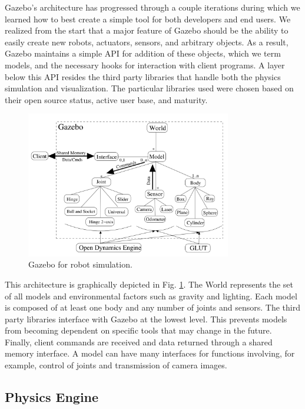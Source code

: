 Gazebo's architecture has progressed through a couple iterations during which we learned how to best create a simple tool for both developers and end users. We realized from the start that a major feature of Gazebo should be the ability to easily create new robots, actuators, sensors, and arbitrary objects. As a result, Gazebo maintains a simple API for addition of these objects, which we term models, and the necessary hooks for interaction with client programs. A layer below this API resides the third party libraries that handle both the physics simulation and visualization. The particular libraries used were chosen based on their open source status, active user base, and maturity.

\begin{figure}[h]
\centering
\includegraphics[width=0.8\textwidth]{figs/ch2/gazebo-structure}
\caption{Gazebo for robot simulation.}
\label{fig:gazebo-structure}
\end{figure}

This architecture is graphically depicted in Fig. \ref{fig:gazebo-structure}. The World represents the set of all models and environmental factors such as gravity and lighting. Each model is composed of at least one body and any number of joints and sensors. The third party libraries interface with Gazebo at the lowest level. This prevents models from becoming dependent on specific tools that may change in the future. Finally, client commands are received and data returned through a shared memory interface. A model can have many interfaces for functions involving, for example, control of joints and transmission of camera images.

\subsection{Physics Engine}

